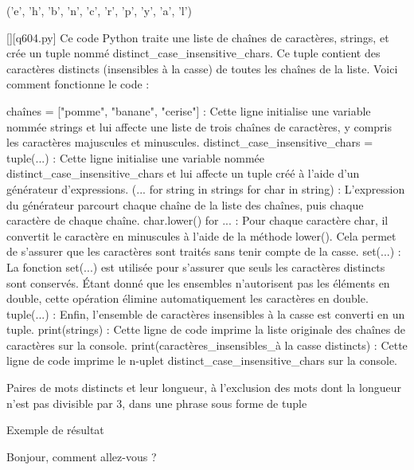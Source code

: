 ('e', 'h', 'b', 'n', 'c', 'r', 'p', 'y', 'a', 'l')
        \par
        \begin{solution}
            \renewcommand{\nomfichier}{q604.py}
            \pythonfile{\chemincode \nomfichier}[][\nomfichier]
            Ce code Python traite une liste de chaînes de caractères, strings, et crée un tuple nommé distinct\_case\_insensitive\_chars. Ce tuple contient des caractères distincts (insensibles à la casse) de toutes les chaînes de la liste. Voici comment fonctionne le code :

    chaînes = ["pomme", "banane", "cerise"] : Cette ligne initialise une variable nommée strings et lui affecte une liste de trois chaînes de caractères, y compris les caractères majuscules et minuscules.
    distinct\_case\_insensitive\_chars = tuple(...) : Cette ligne initialise une variable nommée distinct\_case\_insensitive\_chars et lui affecte un tuple créé à l'aide d'un générateur d'expressions.
        (... for string in strings for char in string) : L'expression du générateur parcourt chaque chaîne de la liste des chaînes, puis chaque caractère de chaque chaîne.
        char.lower() for ... : Pour chaque caractère char, il convertit le caractère en minuscules à l'aide de la méthode lower(). Cela permet de s'assurer que les caractères sont traités sans tenir compte de la casse.
    set(...) : La fonction set(...) est utilisée pour s'assurer que seuls les caractères distincts sont conservés. Étant donné que les ensembles n'autorisent pas les éléments en double, cette opération élimine automatiquement les caractères en double.
    tuple(...) : Enfin, l'ensemble de caractères insensibles à la casse est converti en un tuple.
    print(strings) : Cette ligne de code imprime la liste originale des chaînes de caractères sur la console.
    print(caractères\_insensibles\_à la casse distincts) : Cette ligne de code imprime le n-uplet distinct\_case\_insensitive\_chars sur la console.
        \end{solution}
        

        \question
        Paires de mots distincts et leur longueur, à l'exclusion des mots dont la longueur n'est pas divisible par 3, dans une phrase sous forme de tuple

Exemple de résultat

Bonjour, comment allez-vous ?

